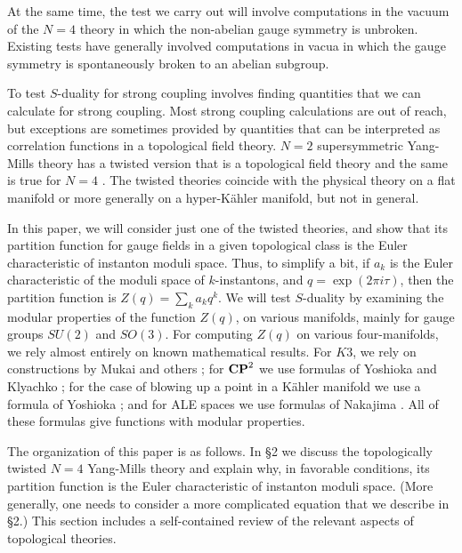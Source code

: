 \documentclass[12pt]{article}
\numberwithin{equation}{section}
\begin{document}
At the same time, the test  we carry out will involve
computations in the vacuum of the $N=4$ theory in which
the non-abelian gauge symmetry
is unbroken.  Existing tests have generally involved computations in
vacua in which the gauge symmetry is spontaneously broken to an abelian
subgroup.

To test $S$-duality for strong coupling involves finding quantities
that we can calculate for strong coupling.  Most strong coupling
calculations are out of reach, but exceptions are sometimes provided
by quantities that can be interpreted as correlation functions in a topological
field theory.
$N=2$ supersymmetric Yang-Mills theory has
a twisted version  that is a topological field theory
\cite{tqft} and the same is true for $N=4$
\cite{yam}.
The twisted theories coincide with the physical theory on a flat
manifold or more generally on a hyper-K\"ahler manifold, but not in general.

In this paper, we will consider just one of the twisted theories,
and show that its partition function for gauge fields in a given
topological class is the Euler characteristic of instanton moduli space.
Thus, to simplify a bit,
if $a_k$ is the Euler characteristic
of the moduli space of $k$-instantons,
and $q=\exp(2\pi i \tau)$, then the partition function is $Z(q)= \sum_ka_kq^k$.
We will test $S$-duality by examining the modular properties
of the function $Z(q)$, on various manifolds, mainly
for gauge groups $SU(2)$ and $SO(3)$.  For computing $Z(q)$ on various
four-manifolds,
we rely almost entirely on known mathematical results.
For $K3$, we rely on constructions by Mukai and others
\cite{mukai,others,bothers};
for ${\bf CP}^2$
we use formulas of Yoshioka and Klyachko \cite{yosh,yoshi,klyachko};
for the case of blowing up a point in a K\"ahler manifold we use
a formula of Yoshioka \cite{yosh}; and for ALE spaces we use formulas
of Nakajima \cite{nakajima}.  All of these
formulas give functions with modular properties.

The organization of this paper is as follows.   In \S2 we discuss
the topologically twisted $N=4$ Yang-Mills theory and explain why, in
favorable conditions,
its partition function is the Euler characteristic of instanton moduli
space.  (More generally, one needs to consider a more complicated
equation that we describe in \S2.) This section
includes a self-contained
review of the relevant aspects of topological theories.
\end{document}
